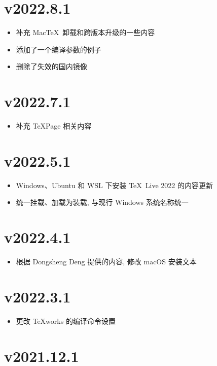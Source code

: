 \section*{v2022.8.1}

\begin{itemize}
  \item 补充 Mac\TeX\ 卸载和跨版本升级的一些内容
  \item 添加了一个编译参数的例子
  \item 删除了失效的国内镜像
\end{itemize}

\section*{v2022.7.1}

\begin{itemize}
  \item 补充 TeXPage 相关内容
\end{itemize}

\section*{v2022.5.1}

\begin{itemize}
  \item Windows、Ubuntu 和 WSL 下安装 \TeX~Live 2022 的内容更新
  \item 统一挂载、加载为装载, 与现行 Windows 系统名称统一
\end{itemize}

\section*{v2022.4.1}

\begin{itemize}
  \item 根据 Dongsheng Deng 提供的内容, 修改 macOS 安装文本
\end{itemize}

\section*{v2022.3.1}

\begin{itemize}
  \item 更改 \TeX works 的编译命令设置
\end{itemize}

\section*{v2021.12.1}

